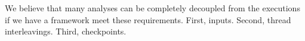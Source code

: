 We believe that many analyses can be completely decoupled from the executions if 
we have a framework meet these requirements. First, inputs. Second, thread 
interleavings. Third, checkpoints.








